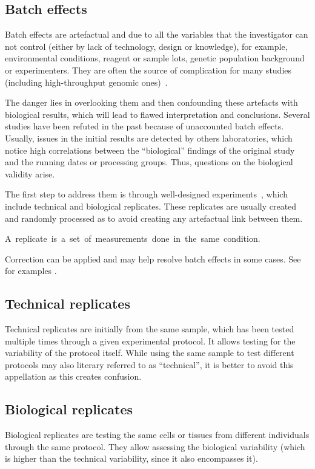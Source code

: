 \subsection{Batch effects}\label{sub:BatchEffect}

Batch effects are artefactual and due to all the variables
that the investigator can not control
(either by lack of technology, design or knowledge), for example,
environmental conditions, reagent or sample lots,
genetic population background or experimenters.
They are often the source of complication for many studies
(including high-throughput genomic ones)~.

The danger lies in overlooking them and then confounding these artefacts
with biological results, which will lead to flawed interpretation and conclusions.
Several studies have been refuted in the past because of unaccounted batch effects.
Usually, issues in the initial results are detected by others laboratories,
which notice high correlations between the \enquote{biological} findings
of the original study and the running dates or processing groups.
Thus, questions on the biological validity arise.

The first step to address them is through well-designed experiments~,
which include technical and biological replicates.
These replicates are usually created and randomly processed
as to avoid creating any artefactual link between them.

A~replicate~is~a~set~of~measurements~done~in~the~same~condition.

Correction can be applied and may help resolve batch effects in some cases.
See for examples \citet{Oytam2016-rb,Gagnon-Bartsch2012-dj,Peixoto2015-wg}.

\subsection{Technical replicates}
Technical replicates are initially from the same sample,
which has been tested multiple times through a given experimental protocol.
It allows testing for the variability of the protocol itself.
While using the same sample to test different protocols
may also literary referred to as \enquote{technical},
it is better to avoid this appellation as this creates confusion.

\subsection{Biological replicates}
Biological replicates are testing the same cells or tissues from different individuals
through the same protocol.
They allow assessing the biological variability
(which is higher than the technical variability, since it also encompasses it).

